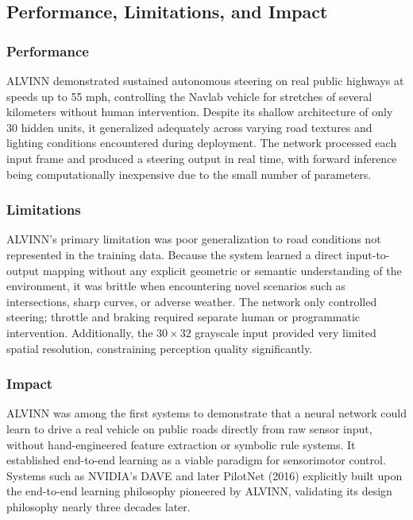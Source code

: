 \documentclass[11pt,a4paper]{report}
\begin{document}

\subsection{Performance, Limitations, and Impact}

\subsubsection{Performance}
ALVINN demonstrated sustained autonomous steering on real public highways at speeds up to 55 mph, controlling
the Navlab vehicle for stretches of several kilometers without human intervention. Despite its shallow architecture
of only 30 hidden units, it generalized adequately across varying road textures and lighting conditions encountered
during deployment. The network processed each input frame and produced a steering output in real time, with forward
inference being computationally inexpensive due to the small number of parameters.

\subsubsection{Limitations}
ALVINN's primary limitation was poor generalization to road conditions not represented in the training data. Because
the system learned a direct input-to-output mapping without any explicit geometric or semantic understanding of the
environment, it was brittle when encountering novel scenarios such as intersections, sharp curves, or adverse weather.
The network only controlled steering; throttle and braking required separate human or programmatic intervention.
Additionally, the $30 \times 32$ grayscale input provided very limited spatial resolution, constraining perception
quality significantly.

\subsubsection{Impact}
ALVINN was among the first systems to demonstrate that a neural network could learn to drive a real vehicle on public
roads directly from raw sensor input, without hand-engineered feature extraction or symbolic rule systems. It
established end-to-end learning as a viable paradigm for sensorimotor control. Systems such as NVIDIA's DAVE and
later PilotNet (2016) explicitly built upon the end-to-end learning philosophy pioneered by ALVINN, validating its
design philosophy nearly three decades later.
\end{document}
